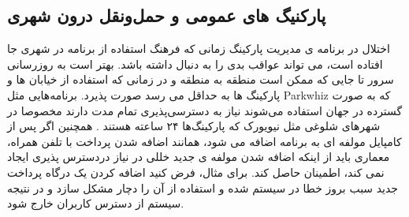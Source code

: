 \subsection{پارکنیگ های عمومی و حمل‌و‌نقل درون شهری}
اختلال در برنامه ی مدیریت پارکینگ زمانی که فرهنگ استفاده از برنامه در شهری جا افتاده است، می تواند عواقب بدی را به دنبال داشته باشد. بهتر است به روزرسانی سرور تا جایی که ممکن است منطقه به منطقه و در زمانی که استفاده از خیابان ها و پارکینگ ها به حداقل می رسد صورت پذیرد.
برنامه‌هایی مثل Parkwhiz که به صورت گسترده در جهان استفاده می‌شوند نیاز به دسترسی‌پذیری تمام مدت دارند مخصوصا در شهر‌های شلوغی مثل نیویورک که پارکینگ‌ها ۲۴ ساعته هستند \cite{parkwhiz_availability} .
همچنین اگر پس از کامپایل مولفه ای به برنامه اضافه می شود، همانند اضافه شدن پرداخت با تلفن همراه، معماری باید از اینکه اضافه شدن مولفه ی جدید خللی در نیاز دردسترس پذیری ایجاد نمی کند، اطمینان حاصل کند. برای مثال، فرض کنید اضافه کردن یک درگاه پرداخت جدید سبب بروز خطا در سیستم شده و استفاده از آن را دچار مشکل سازد و در نتیجه سیستم از دسترس کاربران خارج شود.
















